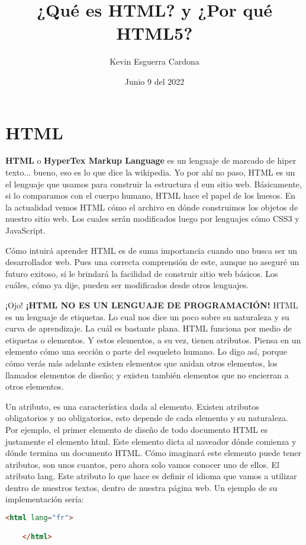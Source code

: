 \documentclass[12pt, letterpaper]{article}
\title{¿Qué es HTML? y ¿Por qué HTML5?}
\author{Kevin Esguerra Cardona}
\date{Junio 9 del 2022}
\begin{document}
    
\maketitle

\section*{HTML}

\textbf{HTML} o \textbf{HyperTex Markup Language} es un lenguaje de marcado de hiper texto... bueno, eso es lo que dice la wikipedia. 
Yo por ahí no paso, HTML es un el lenguaje que usamos para construir la estructura d eun sitio web. Básicamente, si lo comparamos con
el cuerpo humano, HTML hace el papel de los huesos. En la actualidad vemos HTML cómo el archivo en dónde construimos los objetos de 
nuestro sitio web. Los cuales serán modificados luego por lenguajes cómo CSS3 y JavaScript. 

Cómo intuirá aprender HTML es de suma importancia cuando uno busca ser un desarrollador web. Pues una correcta comprensión de este, aunque
no aseguré un futuro exitoso, si le brindará la facilidad de construir sitio web básicos. Los cuáles, cómo ya dije, pueden ser modificados
desde otros lenguajes. 

¡Ojo! \textbf{¡HTML NO ES UN LENGUAJE DE PROGRAMACIÓN!} HTML es un lenguaje de etiquetas. Lo cual nos dice un poco sobre su naturaleza y su
curva de aprendizaje. La cuál es bastante plana. HTML funciona por medio de etiquetas o elementos. Y estos elementos, a su vez, tienen 
atributos. Piensa en un elemento cómo una sección o parte del esqueleto humano. Lo digo así, porque cómo verás más adelante existen elementos
que anidan otros elementos, los llamados elementos de diseño; y existen también elementos que no encierran a otros elementos. 

Un atributo, es una característica dada al elemento. Existen atributos obligatorios y no obligatorios, esto depende de cada elemento y su 
naturaleza. Por ejemplo, el primer elemento de diseño de todo documento HTML es justamente el elemento html. Este elemento dicta al naveador
dónde comienza y dónde termina un documento HTML. Cómo imaginará este elemento puede tener atributos, son unos cuantos, pero ahora solo vamos
conocer uno de ellos. El atributo lang. Este atributo lo que hace es definir el idioma que vamos a utilizar dentro de nuestros textos, dentro
de nuestra página web. Un ejemplo de su implementación sería: 

\begin{lstlisting}[language=HTML]
    <html lang="fr">

    </html>
\end{lstlisting}
\end{document}
